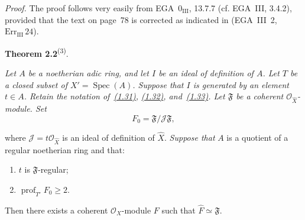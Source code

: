 \medskip
\noindent\textit{Proof.}\quad
The proof follows very easily from EGA~$0_{\mathrm{III}}$, 13.7.7
(cf. EGA~III, 3.4.2), provided that the text on page~78 is corrected as
indicated in (EGA~III~2, $\mathrm{Err}_{\mathrm{III}}\,24$).

\medskip
{}\noindent\textbf{Theorem 2.2}\textsuperscript{(3)}.\quad
{\itshape Let $A$ be a noetherian adic ring, and let $I$ be an ideal of
definition of $A$. Let $T$ be a closed subset of
$X'=\operatorname{Spec}(A)$. Suppose that $I$ is generated by an element
$t\in A$. Retain the notation of~\hyperref[eq:IX.1.31]{(1.31)}, \hyperref[eq:IX.1.32]{(1.32)}, and~\hyperref[eq:IX.1.33]{(1.33)}. Let
$\mathfrak F$ be a coherent $\mathcal O_{\widehat X}$-module. Set
\begin{equation}
\tag{2.8}\label{eq:IX.2.8}
F_0=\mathfrak F/\mathcal J\mathfrak F,
\end{equation}
\par\smallskip
{}
\par\smallskip
where $\mathcal J=t\mathcal O_{\widehat X}$ is an ideal of definition of
$\widehat X$. \emph{Suppose that} $A$ is a quotient of a regular
noetherian ring and that:
\begin{enumerate}
\renewcommand{\labelenumi}{(\arabic{enumi})}
\setlength{\itemsep}{0.35em}
\item $t$ is $\mathfrak F$-regular;
\item $\operatorname{prof}_{T'}F_0\geq 2$.
\end{enumerate}
Then there exists a coherent $\mathcal O_X$-module $F$ such that
$\widehat F\simeq\mathfrak F$.}

